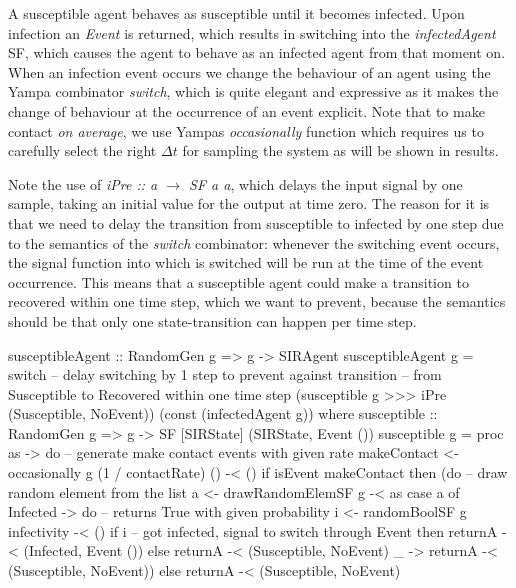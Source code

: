 A susceptible agent behaves as susceptible until it becomes infected. Upon infection an \textit{Event} is returned, which results in switching into the \textit{infectedAgent} SF, which causes the agent to behave as an infected agent from that moment on. When an infection event occurs we change the behaviour of an agent using the Yampa combinator \textit{switch}, which is quite elegant and expressive as it makes the change of behaviour at the occurrence of an event explicit. Note that to make contact \textit{on average}, we use Yampas \textit{occasionally} function which requires us to carefully select the right $\Delta t$ for sampling the system as will be shown in results. 

Note the use of \textit{iPre :: a $\rightarrow$ SF a a}, which delays the input signal by one sample, taking an initial value for the output at time zero. The reason for it is that we need to delay the transition from susceptible to infected by one step due to the semantics of the \textit{switch} combinator: whenever the switching event occurs, the signal function into which is switched will be run at the time of the event occurrence. This means that a susceptible agent could make a transition to recovered within one time step, which we want to prevent, because the semantics should be that only one state-transition can happen per time step.

\begin{HaskellCode}
susceptibleAgent :: RandomGen g => g -> SIRAgent
susceptibleAgent g 
    = switch 
      -- delay switching by 1 step to prevent against transition
      -- from Susceptible to Recovered within one time step
      (susceptible g >>> iPre (Susceptible, NoEvent)) 
      (const (infectedAgent g))
  where
    susceptible :: RandomGen g => g -> SF [SIRState] (SIRState, Event ())
    susceptible g = proc as -> do
      -- generate make contact events with given rate
      makeContact <- occasionally g (1 / contactRate) () -< ()
      if isEvent makeContact
        then (do
          -- draw random element from the list
          a <- drawRandomElemSF g -< as
          case a of
            Infected -> do
              -- returns True with given probability
              i <- randomBoolSF g infectivity -< ()
              if i
                -- got infected, signal to switch through Event
                then returnA -< (Infected, Event ())
                else returnA -< (Susceptible, NoEvent)
             _       -> returnA -< (Susceptible, NoEvent))
        else returnA -< (Susceptible, NoEvent)
\end{HaskellCode}

